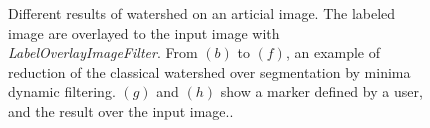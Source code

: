 \documentclass{InsightArticle}
\begin{document}
\begin{figure}[htbp]
\begin{center}
\caption{Different results of watershed on an articial image. The labeled image are overlayed to the input image with {\em LabelOverlayImageFilter}. From $(b)$ to $(f)$, an example of reduction of the classical watershed over segmentation by minima dynamic filtering. $(g)$ and $(h)$ show a marker defined by a user, and the result over the input image..}
\end{center}
\end{figure}
\end{document}
